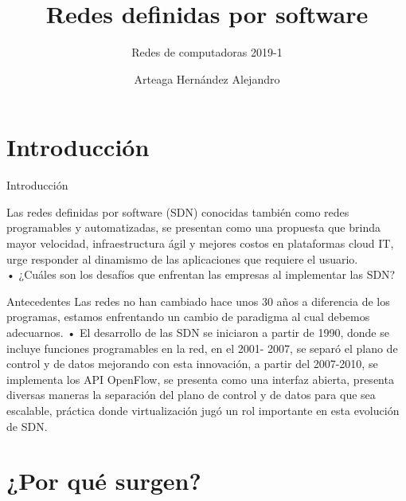 \documentclass[10pt]{beamer}
\title{Redes definidas por software}
\subtitle{Redes de computadoras 2019-1}
\date{}
\author{Arteaga Hernández Alejandro}
\institute{Universidad Autónoma de México}
\begin{document}
\maketitle



\section{Introducción}

\begin{frame}[fragile]{Introducción}

Las redes definidas por software (SDN) conocidas también como
redes programables y automatizadas, se presentan como una
propuesta que brinda mayor velocidad, infraestructura ágil y
mejores costos en plataformas cloud IT, urge responder al
dinamismo de las aplicaciones que requiere el usuario.\\
• ¿Cuáles son los desafíos que enfrentan las empresas al
implementar las SDN? 
\end{frame}


\begin{frame}[fragile]{Antecedentes}
Las redes no han cambiado hace unos 30 años a diferencia
de los programas, estamos enfrentando un cambio de
paradigma al cual debemos adecuarnos.
• El desarrollo de las SDN se iniciaron a partir de 1990, donde
se incluye funciones programables en la red, en el 2001-
2007, se separó el plano de control y de datos mejorando
con esta innovación, a partir del 2007-2010, se implementa
los API OpenFlow, se presenta como una interfaz abierta,
presenta diversas maneras la separación del plano de control
y de datos para que sea escalable, práctica donde
virtualización jugó un rol importante en esta evolución de
SDN.
\end{frame}

\section{¿Por qué surgen?}
\end{document}
